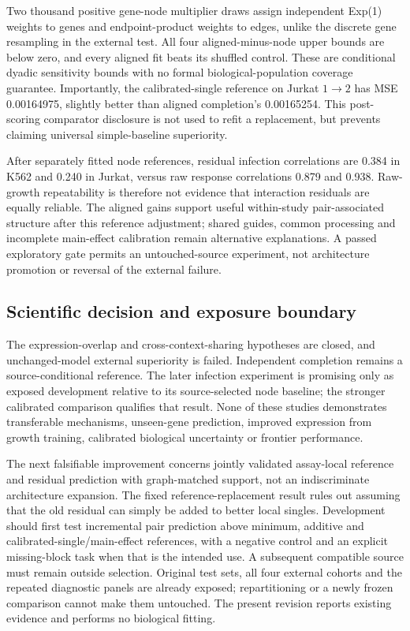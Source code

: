 Two thousand positive gene-node multiplier draws assign independent Exp(1) weights to genes and endpoint-product weights to edges, unlike the discrete gene resampling in the external test. All four aligned-minus-node upper bounds are below zero, and every aligned fit beats its shuffled control. These are conditional dyadic sensitivity bounds with no formal biological-population coverage guarantee. Importantly, the calibrated-single reference on Jurkat $1\to2$ has MSE 0.00164975, slightly better than aligned completion's 0.00165254. This post-scoring comparator disclosure is not used to refit a replacement, but prevents claiming universal simple-baseline superiority.

After separately fitted node references, residual infection correlations are 0.384 in K562 and 0.240 in Jurkat, versus raw response correlations 0.879 and 0.938. Raw-growth repeatability is therefore not evidence that interaction residuals are equally reliable. The aligned gains support useful within-study pair-associated structure after this reference adjustment; shared guides, common processing and incomplete main-effect calibration remain alternative explanations. A passed exploratory gate permits an untouched-source experiment, not architecture promotion or reversal of the external failure.

\subsection{Scientific decision and exposure boundary}
The expression-overlap and cross-context-sharing hypotheses are closed, and unchanged-model external superiority is failed. Independent completion remains a source-conditional reference. The later infection experiment is promising only as exposed development relative to its source-selected node baseline; the stronger calibrated comparison qualifies that result. None of these studies demonstrates transferable mechanisms, unseen-gene prediction, improved expression from growth training, calibrated biological uncertainty or frontier performance.

The next falsifiable improvement concerns jointly validated assay-local reference and residual prediction with graph-matched support, not an indiscriminate architecture expansion. The fixed reference-replacement result rules out assuming that the old residual can simply be added to better local singles. Development should first test incremental pair prediction above minimum, additive and calibrated-single/main-effect references, with a negative control and an explicit missing-block task when that is the intended use. A subsequent compatible source must remain outside selection. Original test sets, all four external cohorts and the repeated diagnostic panels are already exposed; repartitioning or a newly frozen comparison cannot make them untouched. The present revision reports existing evidence and performs no biological fitting.


